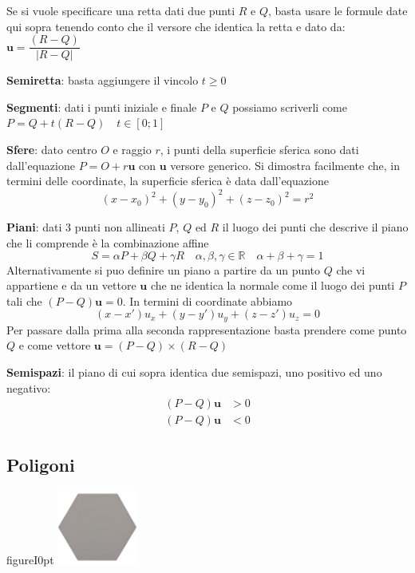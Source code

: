 \documentclass[a4paper, 10pt]{article}
\renewcommand{\vec}{\bm}
\newcommand{\numberset}{\mathbb}
\newcommand{\R}{\numberset{R}}
\begin{document}
	Se si vuole specificare una retta dati due punti $ R $ e $ Q $, basta usare le
	formule date qui sopra tenendo conto che il versore che identica la
	retta e dato da: $ \vec{u}=\dfrac{(R-Q)}{|R-Q|} $
	
	\noindent
	\textbf{Semiretta}: basta aggiungere il vincolo $ t \geq 0 $
	
	\noindent
	\textbf{Segmenti}: dati i punti iniziale e finale $ P $ e $ Q $ possiamo scriverli come 
	$ P = Q + t(R-Q) \quad t \in \left[ 0; 1\right]  $
	
	\noindent
	\textbf{Sfere}: dato centro $ O $ e raggio $ r $, i punti della superficie sferica sono dati
	dall'equazione $ P = O + r\vec{u} $ con $ \vec{u} $ versore generico.
	Si dimostra facilmente che, in termini delle coordinate, la
	superficie sferica è data dall'equazione
	\[
		(x - x_0)^2 +(y - y_0)^2 +(z - z_0)^2 = r^2
	\]
	
	\noindent
	\textbf{Piani}: dati 3 punti non allineati $ P $, $ Q $ ed $ R $ il luogo dei punti che descrive
	il piano che li comprende è la combinazione affine
	\[
		S = \alpha P + \beta Q + \gamma R \quad \alpha,\beta, \gamma \in \R \quad \alpha+\beta+\gamma=1
	\]
	Alternativamente si puo definire un piano a partire da un punto $ Q $ che
	vi appartiene e da un vettore $ \vec{u} $ che ne identica la normale come il luogo
	dei punti $ P $ tali che $ (P - Q) \vec{u} = 0 $.
	In termini di coordinate abbiamo
	\[
		(x-x')u_x + (y-y')u_y + (z-z')u_z = 0
	\]
	Per passare dalla prima alla seconda rappresentazione basta
	prendere come punto $ Q $ e come vettore $ \vec{u} = (P-Q) \times (R-Q) $
	
	\noindent
	\textbf{Semispazi}: il piano di cui sopra identica due semispazi, uno
	positivo ed uno negativo:
	\begin{align*}
		(P-Q) \vec{u} &> 0 \\
		(P-Q) \vec{u} &< 0
	\end{align*}
	
	\subsection{Poligoni}
	
	\begin{wrapfloat}{figure}{I}{0pt}
		\includegraphics[width=0.2\textwidth]{poligono}
	\end{wrapfloat}
	
\end{document}
